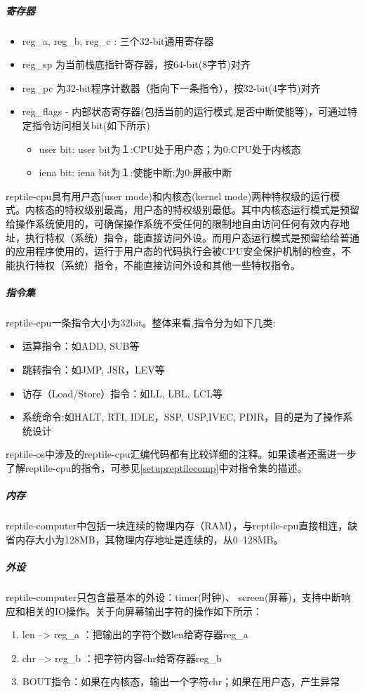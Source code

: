 \subparagraph{寄存器}

\begin{itemize}
	\item reg\_a, reg\_b, reg\_c : 三个32-bit通用寄存器
	\item reg\_sp 为当前栈底指针寄存器，按64-bit(8字节)对齐
	\item reg\_pc 为32-bit程序计数器（指向下一条指令），按32-bit(4字节)对齐
	\item reg\_flags - 内部状态寄存器(包括当前的运行模式,是否中断使能等)，可通过特定指令访问相关bit(如下所示)	
	\begin{itemize}
      \item  user bit: user bit为１:CPU处于用户态；为0:CPU处于内核态
      \item  iena bit: iena bit为１:使能中断;为0:屏蔽中断		
	\end{itemize}
\end{itemize}

reptile-cpu具有用户态(user mode)和内核态(kernel mode)两种特权级的运行模式。内核态的特权级别最高，用户态的特权级别最低。其中内核态运行模式是预留给操作系统使用的，可确保操作系统不受任何的限制地自由访问任何有效内存地址，执行特权（系统）指令，能直接访问外设。而用户态运行模式是预留给给普通的应用程序使用的，运行于用户态的代码执行会被CPU安全保护机制的检查，不能执行特权（系统）指令，不能直接访问外设和其他一些特权指令。

\subparagraph{指令集}
reptile-cpu一条指令大小为32bit。整体来看,指令分为如下几类:
\begin{itemize}
\item 运算指令：如ADD, SUB等
\item 跳转指令：如JMP, JSR，LEV等
\item 访存（Load/Store）指令：如LL, LBL, LCL等
\item 系统命令:如HALT, RTI, IDLE，SSP, USP,IVEC, PDIR，目的是为了操作系统设计
\end{itemize}

reptile-os中涉及的reptile-cpu汇编代码都有比较详细的注释。如果读者还需进一步了解reptile-cpu的指令，可参见\ref{setupreptilecomp}中对指令集的描述。

\subparagraph{内存}
reptile-computer中包括一块连续的物理内存（RAM），与reptile-cpu直接相连，缺省内存大小为128MB，其物理内存地址是连续的，从0--128MB。

\subparagraph{外设}

reptile-computer只包含最基本的外设：timer(时钟)、 screen(屏幕)，支持中断响应和相关的IO操作。关于向屏幕输出字符的操作如下所示：
\begin{enumerate}
\item len --> reg\_a ：把输出的字符个数len给寄存器reg\_a
\item chr --> reg\_b   ：把字符内容chr给寄存器reg\_b
\item BOUT指令：如果在内核态，输出一个字符chr；如果在用户态，产生异常
\end{enumerate}

